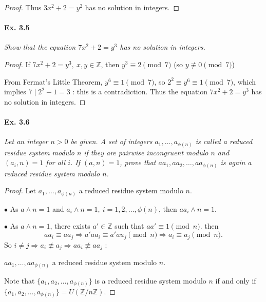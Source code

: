 \documentclass[11pt,a4paper]{article}
\newcommand{\Z}{\mathbb{Z}}
\begin{document}
{\begin{proof}
Thus $3x^2+2 = y^2$ has no solution in integers.
\end{proof}

 \paragraph{Ex. 3.5}

{\it Show that the equation $7x^2 + 2 = y^3$ has no solution in integers.
}

\begin{proof}
If $7x^2 + 2 = y^3,\ x,y \in \Z$, then $y^3 \equiv 2 \pmod 7$ (so $y \not \equiv 0 \pmod 7$)

From Fermat's Little Theorem, $y^6 \equiv 1 \pmod 7$, so $2^2 \equiv y^6 \equiv 1 \pmod 7$, which implies $7 \mid 2^2-1 = 3$ : this is a contradiction. Thus the equation $7x^2 + 2 = y^3$ has no solution in integers.
\end{proof}

\paragraph{Ex. 3.6}

{\it Let an integer $n > 0$ be given. A set of integers $a_1, \ldots, a_{\phi(n)}$ is called a reduced residue system modulo $n$ if they are pairwise incongruent modulo $n$ and $(a_i, n) = 1$ for all $i$. If $(a, n) = 1$, prove that $aa_1 , aa_2, \ldots, aa_{\phi(n)}$ is again a reduced residue system modulo $n$.
}

\begin{proof}
Let  $a_1, \ldots, a_{\phi(n)}$ a reduced residue system modulo $n$.

$\bullet$ As $a\wedge n = 1$ and $a_i \wedge n=1, \ i=1,2,\ldots,\phi(n)$, then $aa_i \wedge n=1$.

$\bullet$ As $a\wedge n = 1$, there exists $a' \in \Z$ such that $aa'\equiv 1 \pmod n$. then
$$a a_i \equiv a a_j \Rightarrow a'aa_i \equiv a'au_j \pmod n \Rightarrow a_i \equiv a_j \pmod n.$$
So $i\neq j \Rightarrow a_i \not \equiv a_j \Rightarrow a a_i \not \equiv a a_j$ :

$aa_1, \ldots, aa_{\phi(n)}$ a reduced residue system modulo $n$.

\medskip

Note that $\{a_1,a_2,\ldots, a_{\phi(n)}\}$ is a reduced residue system modulo $n$  if and only if $\{\overline{a_1},\overline{a_2},\ldots,\overline{a_{\phi(n)}}\} = U(\Z/n\Z)$.
\end{proof}

}
\end{document}
